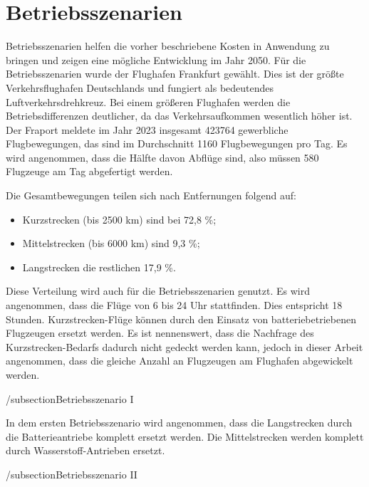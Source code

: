 
\section{Betriebsszenarien}
Betriebsszenarien helfen die vorher beschriebene Kosten in Anwendung zu bringen und zeigen eine mögliche Entwicklung im Jahr 2050.
Für die Betriebsszenarien wurde der Flughafen Frankfurt gewählt. 
Dies ist der größte Verkehrsflughafen Deutschlands und fungiert als bedeutendes Luftverkehrsdrehkreuz. 
Bei einem größeren Flughafen werden die Betriebsdifferenzen deutlicher, da das Verkehrsaufkommen wesentlich höher ist.
Der Fraport meldete im Jahr 2023 insgesamt 423764 gewerbliche Flugbewegungen, das sind im Durchschnitt 1160 Flugbewegungen pro Tag. 
Es wird angenommen, dass die Hälfte davon Abflüge sind, also müssen 580 Flugzeuge am Tag abgefertigt werden.

Die Gesamtbewegungen teilen sich nach Entfernungen folgend auf:
\begin{itemize}
    \item Kurzstrecken (bis 2500 km) sind bei 72,8 \%;
    \item Mittelstrecken (bis 6000 km) sind 9,3 \%;
    \item Langstrecken die restlichen 17,9 \%. 
    \end{itemize}
Diese Verteilung wird auch für die Betriebsszenarien genutzt. 
Es wird angenommen, dass die Flüge von 6 bis 24 Uhr stattfinden. 
Dies entspricht 18 Stunden.
Kurzstrecken-Flüge können durch den Einsatz von batteriebetriebenen Flugzeugen ersetzt werden. 
Es ist nennenswert, dass die Nachfrage des Kurzstrecken-Bedarfs dadurch nicht gedeckt werden kann, 
jedoch in dieser Arbeit angenommen, dass die gleiche Anzahl an Flugzeugen am Flughafen abgewickelt werden.

/subsection{Betriebsszenario I}

In dem ersten Betriebsszenario wird angenommen, dass die Langstrecken durch die Batterieantriebe komplett ersetzt werden.
Die Mittelstrecken werden komplett durch Wasserstoff-Antrieben ersetzt.

/subsection{Betriebsszenario II}
